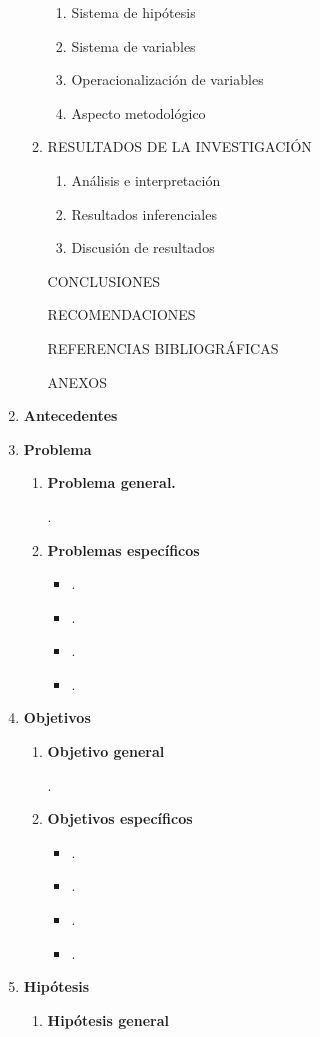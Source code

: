\documentclass[12pt,a4paper]{article}
\begin{document}
\begin{enumerate}
\begin{enumerate}
\begin{enumerate}
			\item Sistema de hipótesis 
			\item Sistema de variables 
			\item Operacionalización de variables 
			\item Aspecto metodológico 
		\end{enumerate}
		\item RESULTADOS DE LA INVESTIGACIÓN
		\begin{enumerate}
			\item Análisis e interpretación 
			\item Resultados inferenciales 
			\item Discusión de resultados 
		\end{enumerate}
		CONCLUSIONES
		
		RECOMENDACIONES
		
		REFERENCIAS BIBLIOGRÁFICAS
		
		ANEXOS
	\end{enumerate}
	\item \textbf{Antecedentes }

	\item \textbf{Problema }
	\begin{enumerate} 
		\item \textbf{Problema general.}
		
		\problema.
		\item \textbf{Problemas específicos}
		\begin{itemize}
			\item \problemae. 
			\item \problemaee. 
			\item \problemaeee. 
			\item \problemaeeee.  
		\end{itemize}
	\end{enumerate}
	\item \textbf{Objetivos }
	\begin{enumerate}
		\item \textbf{Objetivo general}
		
		\objetivo.

		\item \textbf{Objetivos específicos }
		\begin{itemize}
			\item \objetivoe. 
			\item \objetivoee. 
			\item \objetivoeee. 
			\item \objetivoeeee. 
		\end{itemize}
	\end{enumerate}
	\item \textbf{Hipótesis }
	\begin{enumerate}
		\item \textbf{Hipótesis general}
		

\end{enumerate}
\end{enumerate}
\end{document}
